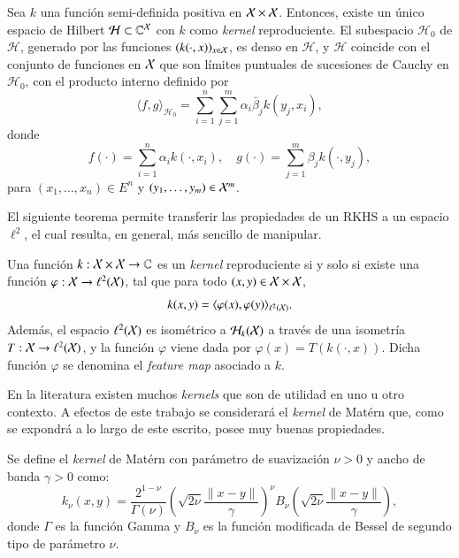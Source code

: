 \begin{teo}
Sea \( k \) una función semi-definida positiva en \( \mathcal{X} \times \mathcal{X} \). Entonces, existe un único espacio de Hilbert \( \mathcal{H} \subset \mathbb{C}^{\mathcal{X}} \) con \( k \) como \textit{kernel} reproduciente. El subespacio \( \mathcal{H}_0 \) de \( \mathcal{H} \), generado por las funciones \( (k(\cdot, x))_{x \in \mathcal{X}} \), es denso en \( \mathcal{H} \), y \( \mathcal{H} \) coincide con el conjunto de funciones en \( \mathcal{X} \) que son límites puntuales de sucesiones de Cauchy en \( \mathcal{H}_0 \), con el producto interno definido por
\[
\langle f, g \rangle_{\mathcal{H}_0} = \sum_{i=1}^n \sum_{j=1}^m \alpha_i \bar{\beta}_j k(y_j, x_i),
\]
donde
\[
f(\cdot) = \sum_{i=1}^n \alpha_i k(\cdot, x_i), \quad g(\cdot) = \sum_{j=1}^m \beta_j k(\cdot, y_j),
\]
para \( (x_1, \dots, x_n) \in E^n \) y \( (y_1, \dots, y_m) \in \mathcal{X}^m \).
\end{teo}

El siguiente teorema permite transferir las propiedades de un RKHS a un espacio \( \ell^2 \), el cual resulta, en general, más sencillo de manipular.

\begin{teo}
Una función \( k: \mathcal{X} \times \mathcal{X} \to \mathbb{C} \) es un \textit{kernel} reproduciente si y solo si existe una función \( \varphi: \mathcal{X} \to \ell^2 (\mathcal{X}) \), tal que para todo \( (x, y) \in \mathcal{X} \times \mathcal{X} \),
\[
k(x, y)= \langle \varphi(x), \varphi(y) \rangle_{\ell^2(\mathcal{X})}.
\]
Además, el espacio \( \ell^2(\mathcal{X}) \) es isométrico a \( \mathcal{H}_k(\mathcal{X}) \) a través de una isometría \( T: \mathcal{X} \to \ell^2(\mathcal{X}) \), y la función \( \varphi \) viene dada por \( \varphi(x) = T(k(\cdot, x)) \). Dicha función \( \varphi \) se denomina el \textit{feature map} asociado a \( k \).
\end{teo}
En la literatura existen muchos \textit{kernels} que son de utilidad en uno u otro contexto. A efectos de este trabajo se considerará el \textit{kernel} de Matérn que, como se expondrá a lo largo de este escrito, posee muy buenas propiedades.
\begin{defn}
Se define el \textit{kernel} de Matérn con parámetro de suavización \( \nu > 0 \) y ancho de banda \( \gamma > 0 \) como:
\[
k_{\nu}(x,y) = \frac{2^{1-\nu}}{\Gamma(\nu)} \left( \sqrt{2\nu} \frac{\|x-y\|}{\gamma} \right)^\nu B_\nu \left( \sqrt{2\nu} \frac{\|x-y\|}{\gamma} \right),
\]
donde \( \Gamma \) es la función Gamma y \( B_\nu \) es la función modificada de Bessel de segundo tipo de parámetro \( \nu \).

\end{defn}

